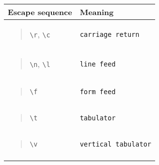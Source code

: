 \begin{longtable}[]{@{}ll@{}}
\toprule
Escape sequence & Meaning\tabularnewline
\midrule
\endhead
\begin{minipage}[t]{0.47\columnwidth}\raggedright
\begin{quote}
\texttt{\textbackslash{}r}, \texttt{\textbackslash{}c}
\end{quote}\strut
\end{minipage} & \begin{minipage}[t]{0.47\columnwidth}\raggedright
\texttt{carriage\ return}\strut
\end{minipage}\tabularnewline
\begin{minipage}[t]{0.47\columnwidth}\raggedright
\begin{quote}
\texttt{\textbackslash{}n}, \texttt{\textbackslash{}l}
\end{quote}\strut
\end{minipage} & \begin{minipage}[t]{0.47\columnwidth}\raggedright
\texttt{line\ feed}\strut
\end{minipage}\tabularnewline
\begin{minipage}[t]{0.47\columnwidth}\raggedright
\begin{quote}
\texttt{\textbackslash{}f}
\end{quote}\strut
\end{minipage} & \begin{minipage}[t]{0.47\columnwidth}\raggedright
\texttt{form\ feed}\strut
\end{minipage}\tabularnewline
\begin{minipage}[t]{0.47\columnwidth}\raggedright
\begin{quote}
\texttt{\textbackslash{}t}
\end{quote}\strut
\end{minipage} & \begin{minipage}[t]{0.47\columnwidth}\raggedright
\texttt{tabulator}\strut
\end{minipage}\tabularnewline
\begin{minipage}[t]{0.47\columnwidth}\raggedright
\begin{quote}
\texttt{\textbackslash{}v}
\end{quote}\strut
\end{minipage} & \begin{minipage}[t]{0.47\columnwidth}\raggedright
\texttt{vertical\ tabulator}\strut
\end{minipage}\tabularnewline
\begin{minipage}[t]{0.47\columnwidth}\raggedright

\end{minipage}
\end{longtable}
